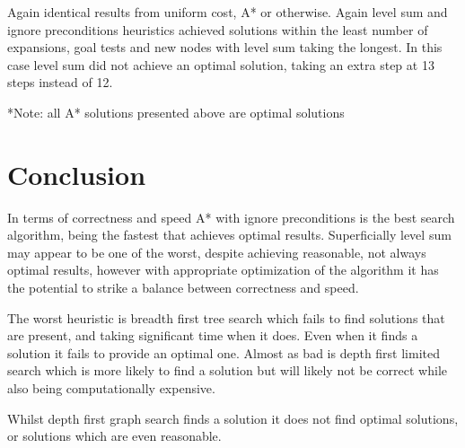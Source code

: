 \documentclass[11pt]{article}
\begin{document}
Again identical results from uniform cost, A* or otherwise. Again level sum and ignore preconditions heuristics achieved solutions within the least number of expansions, goal tests and new nodes with level sum taking the longest. In this case level sum did not achieve an optimal solution, taking an extra step at 13 steps instead of 12.


*Note: all A* solutions presented above are optimal solutions

\section{Conclusion}
In terms of correctness and speed A* with ignore preconditions is the best search algorithm, being the fastest that achieves optimal results. Superficially level sum may appear to be one of the worst, despite achieving reasonable, not always optimal results, however with appropriate optimization of the algorithm it has the potential to strike a balance between correctness and speed.

The worst heuristic is breadth first tree search which fails to find solutions that are present, and taking significant time when it does. Even when it finds a solution it fails to provide an optimal one. Almost as bad is depth first limited search which is more likely to find a solution but will likely not be correct while also being computationally expensive. 

Whilst depth first graph search finds a solution it does not find optimal solutions, or solutions which are even reasonable.



\end{document}
